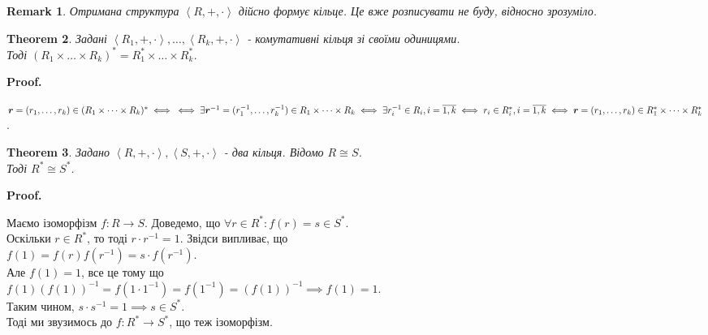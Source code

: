 \documentclass[a4paper, 14pt]{extarticle}
\makeatletter
\theoremstyle{theoremdd}
\newtheorem{theorem}{Theorem}[subsection]
\theoremstyle{theoremdd}
\theoremstyle{theoremdd}
\theoremstyle{theoremdd}
\theoremstyle{theoremdd}
\theoremstyle{theoremdd}
\newtheorem{remark}[theorem]{Remark}
\theoremstyle{theoremdd}
\theoremstyle{theoremdd}
\def\qed{$\blacksquare$}
\renewenvironment{proof}[1][Proof.\\]{\par
\pushQED{\hfill \qed}%
\normalfont \topsep6\p@\@plus6\p@\relax
\trivlist
\item\relax
{\bfseries
#1\@addpunct{.}}\hspace\labelsep\ignorespaces
}{%
\popQED\endtrivlist\@endpefalse
}
\makeatother
\begin{document}
\begin{remark}
Отримана структура $\left<R,+,\cdot \right>$ дійсно формує кільце. Це вже розписувати не буду, відносно зрозуміло.
\end{remark}

\begin{theorem}
Задані $\left<R_1,+,\cdot \right>, \dots, \left<R_k,+,\cdot \right>$ - комутативні кільця зі своїми одиницями.\\
Тоді $(R_1 \times \dots \times R_k)^* = R_1^* \times \dots \times R_k^*$.
\end{theorem}

\begin{proof}
$\boldsymbol{r} = (r_1,\dots,r_k) \in (R_1 \times \dots \times R_k)^* \iff \\ \iff \exists \boldsymbol{r}^{-1} = (r_1^{-1},\dots,r_k^{-1}) \in R_1 \times \dots \times R_k \iff \exists r_i^{-1} \in R_i, i = \overline{1,k} \iff r_i \in R_i^*, i = \overline{1,k} \iff \boldsymbol{r} = (r_1,\dots,r_k) \in R_1^* \times \dots \times R_k^*$.
\end{proof}

\begin{theorem}
Задано $\left<R,+,\cdot \right>, \left<S,+,\cdot \right>$ - два кільця. Відомо $R \cong S$.\\
Тоді $R^* \cong S^*$.
\end{theorem}

\begin{proof}
Маємо ізоморфізм $f: R \to S$. Доведемо, що $\forall r \in R^*: f(r) = s \in S^*$.\\
Оскільки $r \in R^*$, то тоді $r \cdot r^{-1} = 1$. Звідси випливає, що\\
$f(1) = f(r) f(r^{-1}) = s \cdot f(r^{-1})$.\\
Але $f(1) = 1$, все це тому що \\$f(1)(f(1))^{-1} = f(1 \cdot 1^{-1}) = f(1^{-1}) = (f(1))^{-1} \implies f(1) = 1$.\\
Таким чином, $s \cdot s^{-1} = 1 \implies s \in S^*$.\\
Тоді ми звузимось до $f: R^* \to S^*$, що теж ізоморфізм.
\end{proof}

\iffalse
А ось цей наслідок дозволяє дуже просто довести властивість мультиплікативності функції Ейлера, зокрема в силу ізоморфності, ми отримаємо:\\
$\# U_N = \# U_{n_1} \dots \# U_{n_k}$\\
$\varphi(N) = \varphi(n_1) \dots \varphi(n_k)$.
\fi
\end{document}
